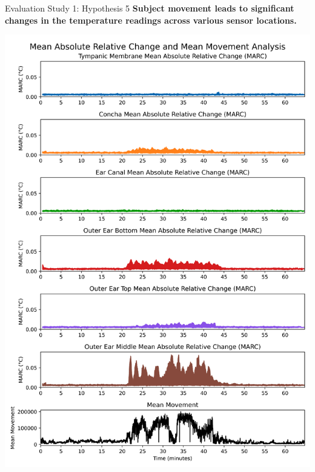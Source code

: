 \documentclass[en]{sdqbeamer}
\begin{document}
\begin{frame}{Evaluation Study 1: Hypothesis 5}
    \textbf{Subject movement leads to significant changes in the temperature readings across various sensor locations.}
    \vspace*{5pt}
    \begin{center}
        \includegraphics[scale=0.17]{../thesis-doc/images/study1/hypothesis5/Hypothesis5_Analysis.png}    
    \end{center}
\end{frame}
\end{document}
